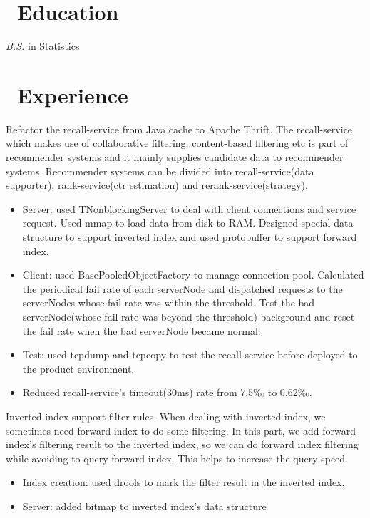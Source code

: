 \documentclass{resume}
\begin{document}



\section{\faGraduationCap\ Education}
\textit{B.S.} in Statistics

\section{\faUsers\ Experience}
Refactor the recall-service from Java cache to Apache Thrift. The recall-service which makes use of collaborative filtering, content-based filtering etc is part of recommender systems and it mainly supplies candidate data to recommender systems. Recommender systems can be divided into recall-service(data supporter), rank-service(ctr estimation) and rerank-service(strategy).
\begin{itemize}
  \item Server: used TNonblockingServer to deal with client connections and service request. Used mmap to load data from disk to RAM. Designed special data structure to support inverted index and used protobuffer to support forward index.
  \item Client: used BasePooledObjectFactory to manage connection pool. Calculated the periodical fail rate of each serverNode and dispatched requests to the serverNodes whose fail rate was within the threshold. Test the bad serverNode(whose fail rate was beyond the threshold) background and reset the fail rate when the bad serverNode became normal.
  \item Test: used tcpdump and tcpcopy to test the recall-service before deployed to the product environment.
  \item Reduced recall-service's timeout(30ms) rate from 7.5‰ to 0.62‰.
\end{itemize}

Inverted index support filter rules. When dealing with inverted index, we sometimes need forward index to do some filtering. In this part, we add forward index's filtering result to the inverted index, so we can do forward index filtering while avoiding to query forward index. This helps to increase the query speed.
\begin{itemize}
  \item Index creation: used drools to mark the filter result in the inverted index.
  \item Server: added bitmap to inverted index's data structure
\end{itemize}
\end{document}
